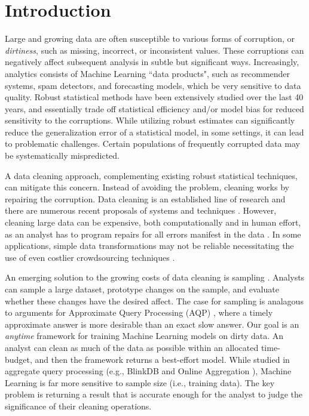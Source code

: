 \section{Introduction}
Large and growing data are often susceptible to various forms of corruption, or \emph{dirtiness}, such as missing, incorrect, or inconsistent values.
These corruptions can negatively affect subsequent analysis in subtle but significant ways.
Increasingly, analytics consists of Machine Learning ``data products", such as recommender systems, spam detectors, and forecasting models, which be very sensitive to data quality.
Robust statistical methods have been extensively studied over the last 40 years, and essentially trade off statistical efficiency and/or model bias for reduced sensitivity to the corruptions. 
While utilizing robust estimates can significantly reduce the generalization error of a statistical model, in some settings, it can lead to problematic challenges. 
Certain populations of frequently corrupted data may be systematically mispredicted.

A data cleaning approach, complementing existing robust statistical techniques, can mitigate this concern.
Instead of avoiding the problem, cleaning works by repairing the corruption.
Data cleaning is an established line of research and there are numerous recent proposals of systems and techniques \cite{khayyat2015bigdansing,sampleclean, chu2015katara, kandel2012}.
However, cleaning large data can be expensive, both computationally and in human effort, as an analyst has to program repairs for all errors manifest in the data \cite{kandel2012}.
In some applications, simple data transformations may not be reliable necessitating the use of even costlier crowdsourcing techniques \cite{gokhale2014corleone,park2014crowdfill}.

An emerging solution to the growing costs of data cleaning is sampling \cite{wang1999sample, trifacta, stonebraker2013data}.
Analysts can sample a large dataset, prototype changes on the sample, and evaluate whether these changes have the desired affect.
The case for sampling is analagous to arguments for Approximate Query Processing (AQP) \cite{DBLP:conf/eurosys/AgarwalMPMMS13}, where a timely approximate answer is more desirable than an exact slow answer.
Our goal is an \emph{anytime} framework for training Machine Learning models on dirty data. 
An analyst can clean as much of the data as possible within an allocated time-budget, and then the framework 
returns a best-effort model.
While studied in aggregate query processing (e.g., BlinkDB \cite{DBLP:conf/eurosys/AgarwalMPMMS13} and Online Aggregation \cite{DBLP:conf/sigmod/HellersteinHW97,DBLP:conf/sigmod/CondieCAHGTES10}), Machine Learning is far more sensitive to sample size (i.e., training data).
The key problem is returning a result that is accurate enough for the analyst to judge the significance of their cleaning operations.

